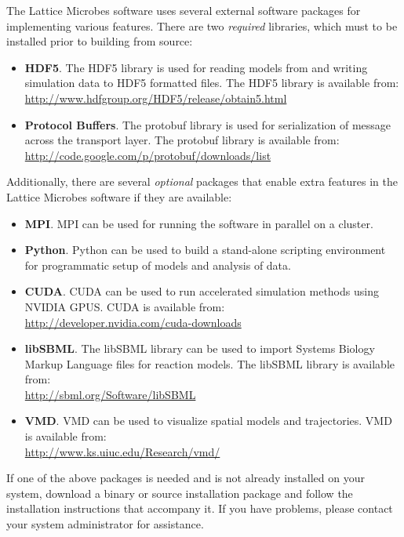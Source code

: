The Lattice Microbes software uses several external software packages for implementing various features. There are two {\it required} libraries, which must to be installed prior to building from source:

\begin{itemize}
\item {\bf HDF5}. The HDF5 library is used for reading models from and writing simulation data to HDF5 formatted files. The HDF5 library is available from:\\ \url{http://www.hdfgroup.org/HDF5/release/obtain5.html}
\item {\bf Protocol Buffers}. The protobuf library is used for serialization of message across the transport layer. The protobuf library is available from:\\ \url{http://code.google.com/p/protobuf/downloads/list}
\end{itemize}

Additionally, there are several {\it optional} packages that enable extra features in the Lattice Microbes software if they are available:

\begin{itemize}
\item {\bf MPI}. MPI can be used for running the software in parallel on a cluster.
\item {\bf Python}. Python can be used to build a stand-alone scripting environment for programmatic setup of models and analysis of data.
\item {\bf CUDA}. CUDA can be used to run  accelerated simulation methods using NVIDIA GPUS. CUDA is available from:\\ \url{http://developer.nvidia.com/cuda-downloads}
\item {\bf libSBML}. The libSBML library can be used to import Systems Biology Markup Language files for reaction models. The libSBML library is available from:\\ \url{http://sbml.org/Software/libSBML}
\item {\bf VMD}. VMD can be used to visualize spatial models and trajectories. VMD is available from:\\ \url{http://www.ks.uiuc.edu/Research/vmd/}
\end{itemize}

If one of the above packages is needed and is not already installed on your system, download a binary or source installation package and follow the installation instructions that accompany it. If you have problems, please contact your system administrator for assistance.\\


